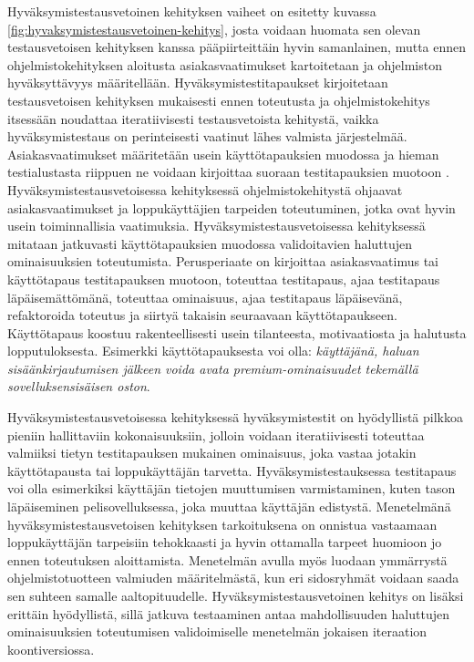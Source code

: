   Hyväksymistestausvetoinen kehityksen vaiheet on esitetty kuvassa \ref{fig:hyvaksymistestausvetoinen-kehitys}, josta voidaan huomata sen olevan testausvetoisen kehityksen kanssa pääpiirteittäin hyvin samanlainen, mutta ennen ohjelmistokehityksen aloitusta asiakasvaatimukset kartoitetaan ja ohjelmiston hyväksyttävyys määritellään.
  Hyväksymistestitapaukset kirjoitetaan testausvetoisen kehityksen mukaisesti ennen toteutusta ja ohjelmistokehitys itsessään noudattaa iteratiivisesti testausvetoista kehitystä, vaikka hyväksymistestaus on perinteisesti vaatinut lähes valmista järjestelmää.
  Asiakasvaatimukset määritetään usein käyttötapauksien muodossa ja hieman testialustasta riippuen ne voidaan kirjoittaa suoraan testitapauksien muotoon \cite{robot_framework_book}.
  Hyväksymistestausvetoisessa kehityksessä ohjelmistokehitystä ohjaavat asiakasvaatimukset ja loppukäyttäjien tarpeiden toteutuminen, jotka ovat hyvin usein toiminnallisia vaatimuksia.
  Hyväksymistestausvetoisessa kehityksessä mitataan jatkuvasti käyttötapauksien muodossa validoitavien haluttujen ominaisuuksien toteutumista.
  Perusperiaate on kirjoittaa asiakasvaatimus tai käyttötapaus testitapauksen muotoon, toteuttaa testitapaus, ajaa testitapaus läpäisemättömänä, toteuttaa ominaisuus, ajaa testitapaus läpäisevänä, refaktoroida toteutus ja siirtyä takaisin seuraavaan käyttötapaukseen.
  Käyttötapaus koostuu rakenteellisesti usein tilanteesta, motivaatiosta ja halutusta lopputuloksesta.
  Esimerkki käyttötapauksesta voi olla: \emph{käyttäjänä, haluan sisäänkirjautumisen jälkeen voida avata premium-ominaisuudet tekemällä sovelluksensisäisen oston}.

  Hyväksymistestausvetoisessa kehityksessä hyväksymistestit on hyödyllistä pilkkoa pieniin hallittaviin kokonaisuuksiin, jolloin voidaan iteratiivisesti toteuttaa valmiiksi tietyn testitapauksen mukainen ominaisuus, joka vastaa jotakin käyttötapausta tai loppukäyttäjän tarvetta.
  Hyväksymistestauksessa testitapaus voi olla esimerkiksi käyttäjän tietojen muuttumisen varmistaminen, kuten tason läpäiseminen pelisovelluksessa, joka muuttaa käyttäjän edistystä.
  Menetelmänä hyväksymistestausvetoisen kehityksen tarkoituksena on onnistua vastaamaan loppukäyttäjän tarpeisiin tehokkaasti ja hyvin ottamalla tarpeet huomioon jo ennen toteutuksen aloittamista.
  Menetelmän avulla myös luodaan ymmärrystä ohjelmistotuotteen valmiuden määritelmästä, kun eri sidosryhmät voidaan saada sen suhteen samalle aaltopituudelle.
  Hyväksymistestausvetoinen kehitys on lisäksi erittäin hyödyllistä, sillä jatkuva testaaminen antaa mahdollisuuden haluttujen ominaisuuksien toteutumisen validoimiselle menetelmän jokaisen iteraation koontiversiossa.

